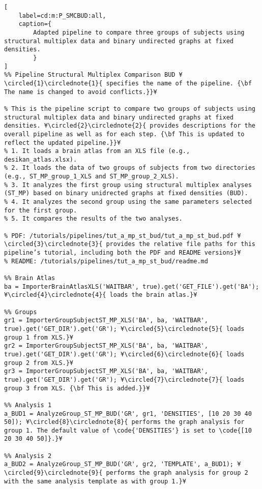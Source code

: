 \documentclass{tufte-handout}
\begin{document}
\begin{lstlisting}[
	label=cd:m:P_SMCBUD:all,
	caption={
		Adapted pipeline to compare three groups of subjects using structural multiplex data and binary undirected graphs at fixed densities.
		}
]
%% Pipeline Structural Multiplex Comparison BUD ¥\circled{1}\circlednote{1}{ specifies the name of the pipeline. {\bf The name is changed to avoid conflicts.}}¥

% This is the pipeline script to compare two groups of subjects using structural multiplex data and binary undirected graphs at fixed densities. ¥\circled{2}\circlednote{2}{ provides descriptions for the overall pipeline as well as for each step. {\bf This is updated to reflect the updated pipeline.}}¥
% 1. It loads a brain atlas from an XLS file (e.g., desikan_atlas.xlsx).
% 2. It loads the data of two groups of subjects from two directories (e.g., ST_MP_group_1_XLS and ST_MP_group_2_XLS).
% 3. It analyzes the first group using structural multiplex analyses (ST_MP) based on binary unidrected graphs at fixed densities (BUD).
% 4. It analyzes the second group using the same parameters selected for the first group.
% 5. It compares the results of the two analyses.

% PDF: /tutorials/pipelines/tut_a_mp_st_bud/tut_a_mp_st_bud.pdf ¥\circled{3}\circlednote{3}{ provides the relative file paths for this pipeline’s tutorial, including both the PDF and README versions}¥
% README: /tutorials/pipelines/tut_a_mp_st_bud/readme.md

%% Brain Atlas
ba = ImporterBrainAtlasXLS('WAITBAR', true).get('GET_FILE').get('BA'); ¥\circled{4}\circlednote{4}{ loads the brain atlas.}¥

%% Groups
gr1 = ImporterGroupSubjectST_MP_XLS('BA', ba, 'WAITBAR', true).get('GET_DIR').get('GR'); ¥\circled{5}\circlednote{5}{ loads group 1 from XLS.}¥
gr2 = ImporterGroupSubjectST_MP_XLS('BA', ba, 'WAITBAR', true).get('GET_DIR').get('GR'); ¥\circled{6}\circlednote{6}{ loads group 2 from XLS.}¥
gr3 = ImporterGroupSubjectST_MP_XLS('BA', ba, 'WAITBAR', true).get('GET_DIR').get('GR'); ¥\circled{7}\circlednote{7}{ loads group 3 from XLS. {\bf This is added.}}¥

%% Analysis 1
a_BUD1 = AnalyzeGroup_ST_MP_BUD('GR', gr1, 'DENSITIES', [10 20 30 40 50]); ¥\circled{8}\circlednote{8}{ performs the graph analysis for group 1. The default value of \code{'DENSITIES'} is set to \code{[10 20 30 40 50]}.}¥

%% Analysis 2
a_BUD2 = AnalyzeGroup_ST_MP_BUD('GR', gr2, 'TEMPLATE', a_BUD1); ¥\circled{9}\circlednote{9}{ performs the graph analysis for group 2 with the same analysis template as with group 1.}¥


\end{lstlisting}
\end{document}
